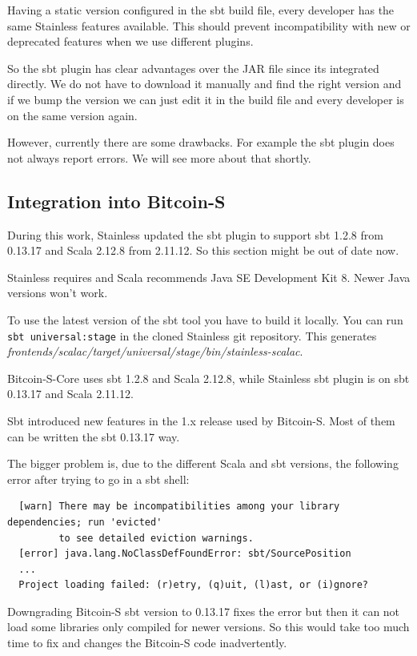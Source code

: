 \documentclass[runningheads]{llncs}
\begin{document}
Having a static version configured in the sbt build file, every
developer has the same Stainless features available.  This should
prevent incompatibility with new or deprecated features when we use
different plugins.

So the sbt plugin has clear advantages over the JAR file since its
integrated directly.  We do not have to download it manually and find
the right version and if we bump the version we can just edit it in
the build file and every developer is on the same version again.

However, currently there are some drawbacks.  For example the sbt
plugin does not always report errors.  We will see more about that
shortly.


\subsection{Integration into Bitcoin-S}

During this work, Stainless updated the sbt plugin to support sbt
1.2.8 from 0.13.17 and Scala 2.12.8 from 2.11.12.  So this section
might be out of date now.

Stainless requires and Scala recommends Java SE Development Kit 8.
Newer Java versions won't work.

To use the latest version of the sbt tool you have to build it
locally.  You can run \texttt{sbt universal:stage} in the cloned
Stainless git repository.  This generates
\emph{frontends/scalac/target/universal/stage/bin/stainless-scalac}.

Bitcoin-S-Core uses sbt 1.2.8 and Scala 2.12.8, while Stainless sbt
plugin is on sbt 0.13.17 and Scala 2.11.12.

Sbt introduced new features in the 1.x release used by Bitcoin-S.
Most of them can be written the sbt 0.13.17 way.

The bigger problem is, due to the different Scala and sbt versions,
the following error after trying to go in a sbt shell:
\begin{verbatim}
  [warn] There may be incompatibilities among your library dependencies; run 'evicted'
         to see detailed eviction warnings.
  [error] java.lang.NoClassDefFoundError: sbt/SourcePosition
  ...
  Project loading failed: (r)etry, (q)uit, (l)ast, or (i)gnore?
\end{verbatim}

Downgrading Bitcoin-S sbt version to 0.13.17 fixes the error but then
it can not load some libraries only compiled for newer versions.  So
this would take too much time to fix and changes the Bitcoin-S code
inadvertently.
\end{document}
